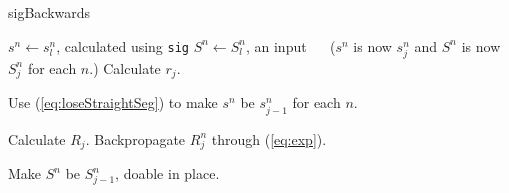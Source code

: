 \newsavebox{\inneralga}
\newsavebox{\inneralgb}
\newsavebox{\inneralgc}

\begin{algorithm}\caption{sigBackwards\label{alg:sigbackwards}}
	\begin{algorithmic}[1]
		\State $s^n\gets s_l^n$, calculated using \verb|sig|
		\State $S^n\gets S_l^n$, an input
		\EndFor
		\Statex $\quad$ ($s^n$ is now $s^n_{j}$ and $S^n$ is now $S^n_j$ for each $n$.)
		\State Calculate $r_j$.
		\State \parbox{1.4in}{Use \hbox{(\ref*{eq:loseStraightSeg})} to make $s^n$ be $s^n_{j-1}$ for each $n$.}\hfill{\usebox{\inneralga}}
		\Statex
		\Statex
		\State Calculate $R_j$.\hfill{\usebox{\inneralgb}}
		\State Backpropagate $R^n_j$ through (\ref*{eq:exp}).
		\State \parbox{1.4in}{\raggedright Make $S^n$ be $S^n_{j-1}$, doable in place.}\hfill\usebox{\inneralgc}

		\EndFor
		
	\end{algorithmic}
\end{algorithm}
